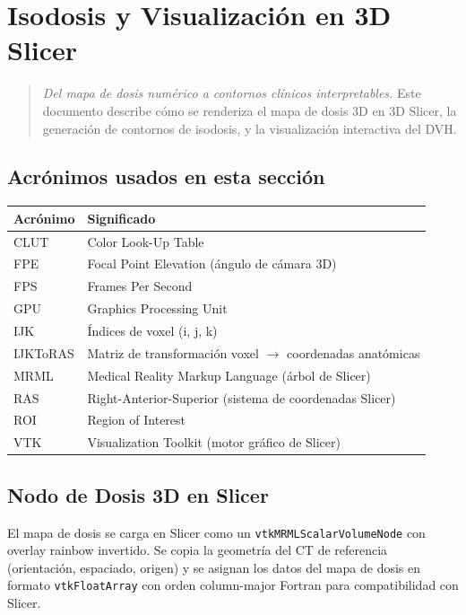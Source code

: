 \documentclass[12pt,a4paper]{article}
\begin{document}
\section{Isodosis y Visualización en 3D Slicer}

\begin{quote}
\textit{Del mapa de dosis numérico a contornos clínicos interpretables.} Este documento describe cómo se renderiza el mapa de dosis 3D en 3D Slicer, la generación de contornos de isodosis, y la visualización interactiva del DVH.
\end{quote}

\subsection*{Acrónimos usados en esta sección}

\begin{tabular}{p{3cm} p{12cm}}
\toprule
\textbf{Acrónimo} & \textbf{Significado} \\
\midrule
CLUT & Color Look-Up Table \\
FPE & Focal Point Elevation (ángulo de cámara 3D) \\
FPS & Frames Per Second \\
GPU & Graphics Processing Unit \\
IJK & Índices de voxel (i, j, k) \\
IJKToRAS & Matriz de transformación voxel $\to$ coordenadas anatómicas \\
MRML & Medical Reality Markup Language (árbol de Slicer) \\
RAS & Right-Anterior-Superior (sistema de coordenadas Slicer) \\
ROI & Region of Interest \\
VTK & Visualization Toolkit (motor gráfico de Slicer) \\
\bottomrule
\end{tabular}

\subsection{Nodo de Dosis 3D en Slicer}

El mapa de dosis se carga en Slicer como un \texttt{vtkMRMLScalarVolumeNode} con overlay rainbow invertido. Se copia la geometría del CT de referencia (orientación, espaciado, origen) y se asignan los datos del mapa de dosis en formato \texttt{vtkFloatArray} con orden column-major Fortran para compatibilidad con Slicer.
\end{document}
